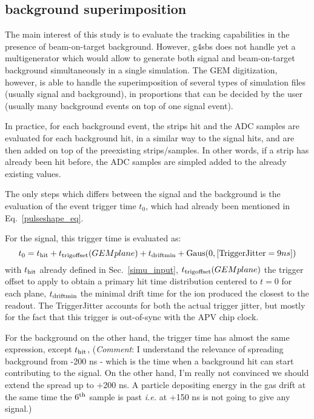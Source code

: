 \subsection{background superimposition}
\label{bkgd_superimp}
The main interest of this study is to evaluate the tracking capabilities in the presence of beam-on-target background. However, g4sbs does not handle yet a multigenerator which would allow to generate both signal and beam-on-target background simultaneously in a single simulation.
The GEM digitization, however, is able to handle the superimposition of several types of simulation files (usually signal and background), in proportions that can be decided by the user (usually many background events on top of one signal event).

In practice, for each background event, the strips hit and the ADC samples are evaluated for each background hit, in a similar way to the signal hits, and are then added on top of the preexisting strips/samples.
In other words, if a strip has already been hit before, the ADC samples are simpled added to the already existing values.

The only steps which differs between the signal and the background is the evaluation 
of the event trigger time $t_0$, which had already been mentioned in Eq.~\ref{pulseshape_eq}.

For the signal, this trigger time is evaluated as:
%
\begin{equation}
  t_0 = t_{\rm hit} + t_{\rm trig offset}(GEM plane) + t_{\rm drift min} + {\rm Gaus}(0, [{\rm TriggerJitter} = 9 ns])
\end{equation}
%
with $t_{\rm hit}$ already defined in Sec.~\ref{simu_input}, $t_{\rm trig offset}(GEM plane)$ the trigger offset to apply to obtain a primary hit time distribution centered to $t = 0$ for each plane, $t_{\rm drift min}$ the minimal drift time for the ion produced the closest to the readout.
The TriggerJitter accounts for both the actual trigger jitter, but mostly for the fact that this trigger is out-of-sync with the APV chip clock.

For the background on the other hand, the trigger time has almost the same expression, except $t_{\rm hit}$, %
%
%
({\it Comment}: I understand the relevance of spreading background from -200 ns - which is the time when a background hit can start contributing to the signal. On the other hand, I'm really not convinced we should extend the spread up to +200 ns. A particle depositing energy in the gas drift at the same time the $6^{\rm th}$ sample is past {\it i.e.} at +150 ns is not going to give any signal.)

